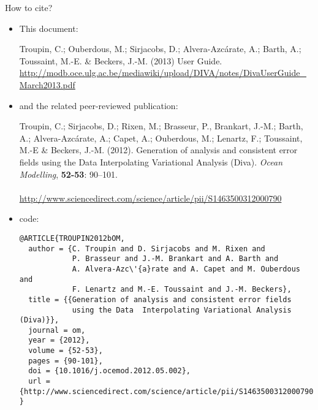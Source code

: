 \newpage

\vspace*{\fill}

\begin{center}
\begin{minipage}[c]{.85\textwidth}
\Large{How to cite?}
\vspace{1cm}
\normalsize


\begin{itemize}
\item This document:


Troupin, C.; Ouberdous, M.; Sirjacobs, D.; Alvera-Azcárate, A.; Barth, A.; Toussaint, M.-E. \& Beckers, J.-M. (2013) \diva User Guide.\\
\url{http://modb.oce.ulg.ac.be/mediawiki/upload/DIVA/notes/DivaUserGuide_March2013.pdf}


\item and the related peer-reviewed publication:


Troupin, C.; Sirjacobs, D.; Rixen, M.; Brasseur, P., Brankart, J.-M.; Barth,
A.; Alvera-Azc\'{a}rate, A.; Capet, A.; Ouberdous, M.; Lenartz, F.;
Toussaint, M.-E \& Beckers, J.-M. (2012).
Generation of analysis and consistent error fields using the Data
Interpolating Variational Analysis (Diva).
\emph{Ocean Modelling}, \textbf{52-53}: 90--101.\\
\\
\url{http://www.sciencedirect.com/science/article/pii/S1463500312000790}

\item[]

{\scriptsize
\BibTeX code:
\begin{verbatim}
@ARTICLE{TROUPIN2012bOM,
  author = {C. Troupin and D. Sirjacobs and M. Rixen and 
            P. Brasseur and J.-M. Brankart and A. Barth and 
            A. Alvera-Azc\'{a}rate and A. Capet and M. Ouberdous and 
            F. Lenartz and M.-E. Toussaint and J.-M. Beckers},
  title = {{Generation of analysis and consistent error fields 
            using the Data 	Interpolating Variational Analysis (Diva)}},
  journal = om,
  year = {2012},
  volume = {52-53},
  pages = {90-101},
  doi = {10.1016/j.ocemod.2012.05.002},
  url = {http://www.sciencedirect.com/science/article/pii/S1463500312000790}
}
\end{verbatim}
}

\end{itemize}


\vspace{.25cm}
\end{minipage}

\end{center}

\vspace*{\fill}

